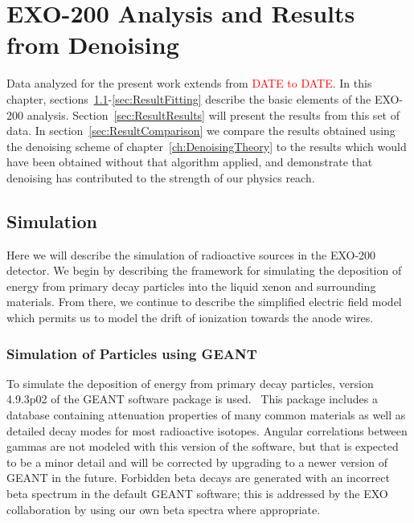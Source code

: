 
\renewcommand{\thechapter}{6}
\chapter{EXO-200 Analysis and Results from Denoising}
\label{ch:DenoisingResults}

Data analyzed for the present work extends from \textcolor{red}{DATE to DATE}.  In this chapter, sections~\ref{sec:ResultSimulation}-\ref{sec:ResultFitting} describe the basic elements of the EXO-200 analysis.  Section~\ref{sec:ResultResults} will present the results from this set of data.  In section~\ref{sec:ResultComparison} we compare the results obtained using the denoising scheme of chapter~\ref{ch:DenoisingTheory} to the results which would have been obtained without that algorithm applied, and demonstrate that denoising has contributed to the strength of our physics reach.

\section{Simulation}\label{sec:ResultSimulation}

Here we will describe the simulation of radioactive sources in the EXO-200 detector.  We begin by describing the framework for simulating the deposition of energy from primary decay particles into the liquid xenon and surrounding materials.  From there, we continue to describe the simplified electric field model which permits us to model the drift of ionization towards the anode wires.

\subsection{Simulation of Particles using GEANT}

To simulate the deposition of energy from primary decay particles, version 4.9.3p02 of the GEANT software package is used.~\cite{Agostinelli2003250}\cite{1610988}  This package includes a database containing attenuation properties of many common materials as well as detailed decay modes for most radioactive isotopes.  Angular correlations between gammas are not modeled with this version of the software, but that is expected to be a minor detail and will be corrected by upgrading to a newer version of GEANT in the future.  Forbidden beta decays are generated with an incorrect beta spectrum in the default GEANT software; this is addressed by the EXO collaboration by using our own beta spectra where appropriate.

